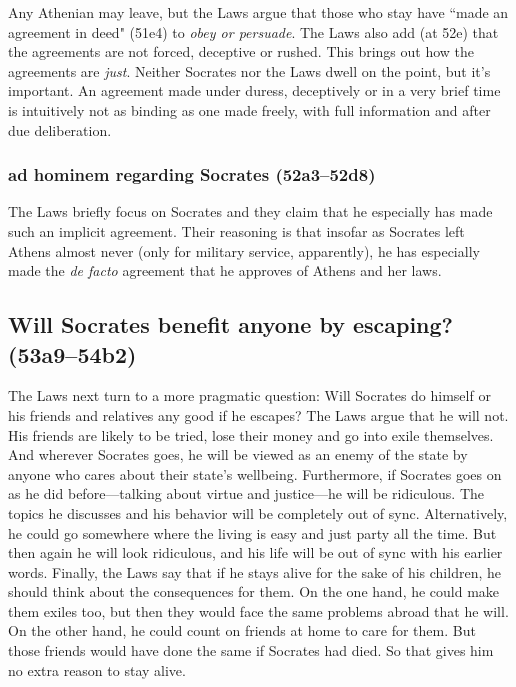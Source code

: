 \documentclass[12pt,letterpaper]{article}
\begin{document}
Any Athenian may leave, but the Laws argue that those who stay have ``made an agreement in deed" (51e4) to \emph{obey or persuade}. The Laws also add (at 52e) that the agreements are not forced, deceptive or rushed. This brings out how the agreements are \emph{just}. Neither Socrates nor the Laws dwell on the point, but it's important. An agreement made under duress, deceptively or in a very brief time is intuitively not as binding as one made freely, with full information and after due deliberation.


\subsubsection*{ad hominem regarding Socrates (52a3--52d8)}

The Laws briefly focus on Socrates and they claim that he especially has made such an implicit agreement. Their reasoning is that insofar as Socrates left Athens almost never (only for military service, apparently), he has especially made the \textit{de facto} agreement that he approves of Athens and her laws.


\subsection*{Will Socrates benefit anyone by escaping? (53a9--54b2)}

The Laws next turn to a more pragmatic question: Will Socrates do himself or his friends and relatives any good if he escapes?  The Laws argue that he will not. His friends are likely to be tried, lose their money and go into exile themselves. And wherever Socrates goes, he will be viewed as an enemy of the state by anyone who cares about their state's wellbeing. Furthermore, if Socrates goes on as he did before---talking about virtue and justice---he will be ridiculous. The topics he discusses and his behavior will be completely out of sync. Alternatively, he could go somewhere where the living is easy and just party all the time. But then again he will look ridiculous, and his life will be out of sync with his earlier words. Finally, the Laws say that if he stays alive for the sake of his children, he should think about the consequences for them. On the one hand, he could make them exiles too, but then they would face the same problems abroad that he will. On the other hand, he could count on friends at home to care for them. But those friends would have done the same if Socrates had died. So that gives him no extra reason to stay alive.
\end{document}
